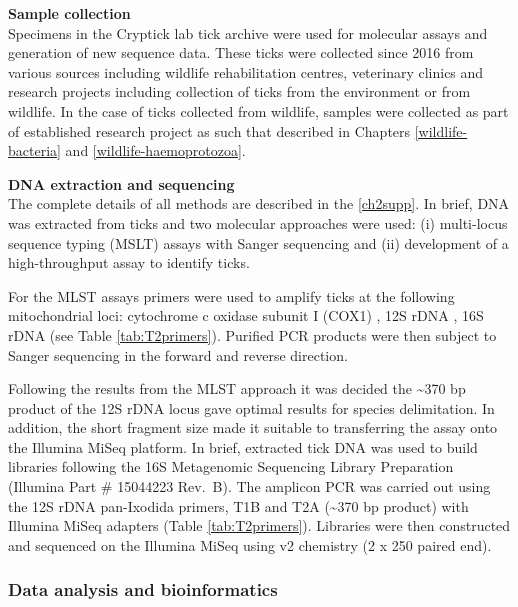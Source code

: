 \documentclass[a4paper, nobind]{templates/ociamthesis}
\begin{document}
\textbf{Sample collection}\\
Specimens in the Cryptick lab tick archive were used for molecular assays and generation of new sequence data.
These ticks were collected since 2016 from various sources including wildlife rehabilitation centres, veterinary clinics and research projects including collection of ticks from the environment or from wildlife.
In the case of ticks collected from wildlife, samples were collected as part of established research project as such that described in Chapters \ref{wildlife-bacteria} and \ref{wildlife-haemoprotozoa}.

\textbf{DNA extraction and sequencing}\\
The complete details of all methods are described in the \ref{ch2supp}.
In brief, DNA was extracted from ticks and two molecular approaches were used: (i) multi-locus sequence typing (MSLT) assays with Sanger sequencing and (ii) development of a high-throughput assay to identify ticks.

For the MLST assays primers were used to amplify ticks at the following mitochondrial loci: cytochrome c oxidase subunit I (COX1) \autocite{songPhylogeneticPhylogeographicRelationships2011}, 12S rDNA \autocite{beatiAnalysisSystematicRelationships2001}, 16S rDNA \autocite{lvDevelopmentDNABarcoding2014} (see Table \ref{tab:T2primers}).
Purified PCR products were then subject to Sanger sequencing in the forward and reverse direction.

Following the results from the MLST approach it was decided the \textasciitilde370 bp product of the 12S rDNA locus gave optimal results for species delimitation.
In addition, the short fragment size made it suitable to transferring the assay onto the Illumina MiSeq platform.
In brief, extracted tick DNA was used to build libraries following the 16S Metagenomic Sequencing Library Preparation (Illumina Part \# 15044223 Rev.~B).
The amplicon PCR was carried out using the 12S rDNA pan-Ixodida primers, T1B and T2A \autocite{beatiAnalysisSystematicRelationships2001} (\textasciitilde370 bp product) with Illumina MiSeq adapters (Table \ref{tab:T2primers}).
Libraries were then constructed and sequenced on the Illumina MiSeq using v2 chemistry (2 x 250 paired end).

\hypertarget{data-analysis-and-bioinformatics}{%
\subsubsection{Data analysis and bioinformatics}\label{data-analysis-and-bioinformatics}}
\end{document}
